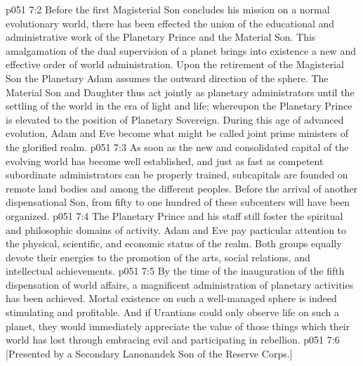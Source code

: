 \vs p051 7:2 Before the first Magisterial Son concludes his mission on a normal evolutionary world, there has been effected the union of the educational and administrative work of the Planetary Prince and the Material Son. This amalgamation of the dual supervision of a planet brings into existence a new and effective order of world administration. Upon the retirement of the Magisterial Son the Planetary Adam assumes the outward direction of the sphere. The Material Son and Daughter thus act jointly as planetary administrators until the settling of the world in the era of light and life; whereupon the Planetary Prince is elevated to the position of Planetary Sovereign. During this age of advanced evolution, Adam and Eve become what might be called joint prime ministers of the glorified realm.
\vs p051 7:3 As soon as the new and consolidated capital of the evolving world has become well established, and just as fast as competent subordinate administrators can be properly trained, subcapitals are founded on remote land bodies and among the different peoples. Before the arrival of another dispensational Son, from fifty to one hundred of these subcenters will have been organized.
\vs p051 7:4 The Planetary Prince and his staff still foster the spiritual and philosophic domains of activity. Adam and Eve pay particular attention to the physical, scientific, and economic status of the realm. Both groups equally devote their energies to the promotion of the arts, social relations, and intellectual achievements.
\vs p051 7:5 By the time of the inauguration of the fifth dispensation of world affairs, a magnificent administration of planetary activities has been achieved. Mortal existence on such a well\hyp{}managed sphere is indeed stimulating and profitable. And if Urantians could only observe life on such a planet, they would immediately appreciate the value of those things which their world has lost through embracing evil and participating in rebellion.
\vsetoff
\vs p051 7:6 [Presented by a Secondary Lanonandek Son of the Reserve Corps.]

